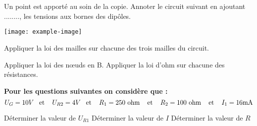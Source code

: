 \documentclass[11pt]{exam}		%
\title{\Titre}
\newcommand{\Titre}{} %
\begin{document}
\thispagestyle{headandfoot}

\section{\Titre} %

\headrule
\footrule
\setlength{\columnsep}{0.25cm}
\setlength{\columnseprule}{1pt}

\consignes



\begin{questions}
	\question[1] Un point est apporté au soin de la copie.
	\question[2] Annoter le circuit suivant en ajoutant ........, les tensions aux bornes des dipôles.

	\begin{center}
		\texttt{[image: example-image]}
	\end{center}

	\question[3] Appliquer la loi des mailles sur chacune des trois mailles du circuit.

	\question[1] Appliquer la loi des n\oe uds en B.
	\clearpage
	\question[3] Appliquer la loi d'ohm sur chacune des résistances.

	\begin{center}
		\textbf{	Pour les questions suivantes on considère que :
		}
		\vspace{-5pt}
		$$U_G=10V \text{\phantom{a} et \phantom{a} } U_{R2}=4V \text{\phantom{a} et \phantom{a} }R_1=250\text{  ohm }\text{\phantom{a} et \phantom{a} }R_2=100\text{ ohm }\text{\phantom{a} et \phantom{a} }I_1=16\text{mA}$$
	\end{center}
	\question[3] Déterminer la valeur de $U_{R1}$
	\question[3] Déterminer la valeur de $I$
	\question[4] Déterminer la valeur de $R$

\end{questions}


\countpoint
\end{document}
